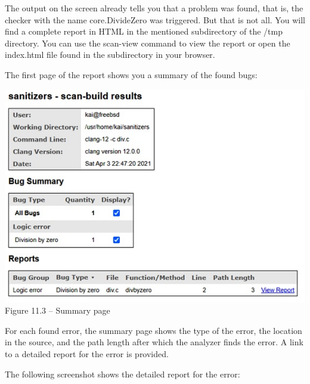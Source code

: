 The output on the screen already tells you that a problem was found, that is, the checker with the name core.DivideZero was triggered. But that is not all. You will find a complete report in HTML in the mentioned subdirectory of the /tmp directory. You can use the scan-view command to view the report or open the index.html file found in the subdirectory in your browser.\par

The first page of the report shows you a summary of the found bugs:\par

\hspace*{\fill} \par %
\begin{center}
\includegraphics[width=1\textwidth]{content/3/chapter11/images/3.jpg}\\
Figure 11.3 – Summary page
\end{center}

For each found error, the summary page shows the type of the error, the location in the source, and the path length after which the analyzer finds the error. A link to a detailed report for the error is provided.\par

The following screenshot shows the detailed report for the error:\par


